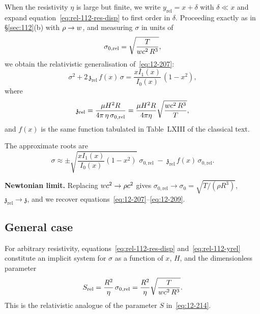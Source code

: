 When the resistivity $\eta$ is large but finite, we write
$y_{\mathrm{rel}} = x + \delta$ with $\delta \ll x$ and expand
equation~\eqref{eq:rel-112-res-disp} to first order in $\delta$.
Proceeding exactly as in \S\ref{sec:112}(b) with $\rho \to w$,
and measuring $\sigma$ in units of
\begin{equation}
\label{eq:rel-112-sigma0}
\sigma_{0,\mathrm{rel}}
  = \sqrt{\frac{T}{w c^{2}\,R^{3}}},
\end{equation}
we obtain the relativistic generalisation of~\eqref{eq:12-207}:
\begin{equation}
\label{eq:rel-112-highres-disp}
\sigma^{2} + 2\,\mathfrak{z}_{\mathrm{rel}}\,f(x)\,\sigma
  = \frac{xI_{1}(x)}{I_{0}(x)}\,(1-x^{2}),
\end{equation}
where
\begin{equation}
\label{eq:rel-112-zrel}
\mathfrak{z}_{\mathrm{rel}}
  = \frac{\mu H^{2}R}{4\pi\,\eta\,\sigma_{0,\mathrm{rel}}}
  = \frac{\mu H^{2}R}{4\pi\eta}
  \sqrt{\frac{w c^{2}\,R^{3}}{T}},
\end{equation}
and $f(x)$ is the same function tabulated in Table~LXIII of the
classical text.

The approximate roots are
\begin{equation}
\label{eq:rel-112-highres-roots}
\sigma \approx \pm\sqrt{
  \frac{xI_{1}(x)}{I_{0}(x)}(1-x^{2})}\;
  \sigma_{0,\mathrm{rel}}
  \;-\; \mathfrak{z}_{\mathrm{rel}}\,f(x)\,
  \sigma_{0,\mathrm{rel}}.
\end{equation}

\begin{relcorrection}
\textbf{Newtonian limit.}
Replacing $w c^{2} \to \rho c^{2}$ gives
$\sigma_{0,\mathrm{rel}} \to \sigma_{0} = \sqrt{T/(\rho R^{3})}$,
$\mathfrak{z}_{\mathrm{rel}} \to \mathfrak{z}$, and we recover
equations~\eqref{eq:12-207}--\eqref{eq:12-209}.
\end{relcorrection}

\subsection{General case}
\label{sec:rel-112-general}

For arbitrary resistivity, equations~\eqref{eq:rel-112-res-disp}
and~\eqref{eq:rel-112-yrel} constitute an implicit system for
$\sigma$ as a function of $x$, $H$, and the dimensionless
parameter
\begin{equation}
\label{eq:rel-112-Srel}
S_{\mathrm{rel}} = \frac{R^{2}}{\eta}\,\sigma_{0,\mathrm{rel}}
  = \frac{R^{2}}{\eta}\sqrt{\frac{T}{w c^{2}\,R^{3}}}.
\end{equation}
This is the relativistic analogue of the parameter $S$
in~\eqref{eq:12-214}.

